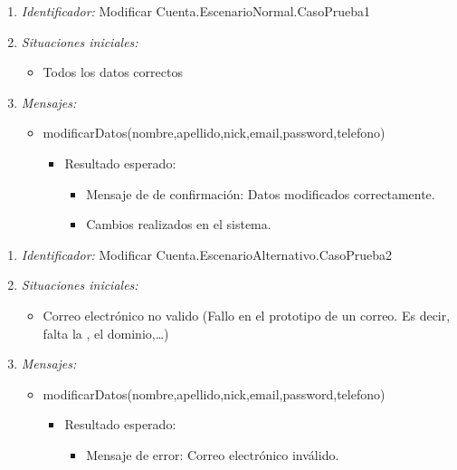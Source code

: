 
\begin{enumerate}
	\item {\it Identificador:} Modificar Cuenta.EscenarioNormal.CasoPrueba1
	\item {\it Situaciones iniciales:}
    		\begin{itemize}
    			\item Todos los datos correctos
		\end{itemize}
	\item {\it Mensajes:}
		\begin{itemize}
			\item modificarDatos(nombre,apellido,nick,email,password,telefono)
				 \begin{itemize}
					 	\item Resultado esperado:
					 \begin{itemize}
		       			 \item Mensaje de de confirmación: Datos modificados correctamente.
		       			 \item Cambios realizados en el sistema.
					 \end{itemize}
				 \end{itemize}
		\end{itemize}
\end{enumerate}

\begin{enumerate}
	\item {\it Identificador:} Modificar Cuenta.EscenarioAlternativo.CasoPrueba2
	\item {\it Situaciones iniciales:}
    		\begin{itemize}
    			\item Correo electrónico no valido (Fallo en el prototipo de un correo. Es decir, falta la \@, el dominio,\ldots)
		\end{itemize}
	\item {\it Mensajes:}
		\begin{itemize}
			\item modificarDatos(nombre,apellido,nick,email,password,telefono)
				\begin{itemize}
					 \item Resultado esperado:
					 \begin{itemize}
		       			 \item Mensaje de error: Correo electrónico inválido.
					 \end{itemize}
				\end{itemize}
		\end{itemize}
\end{enumerate}


